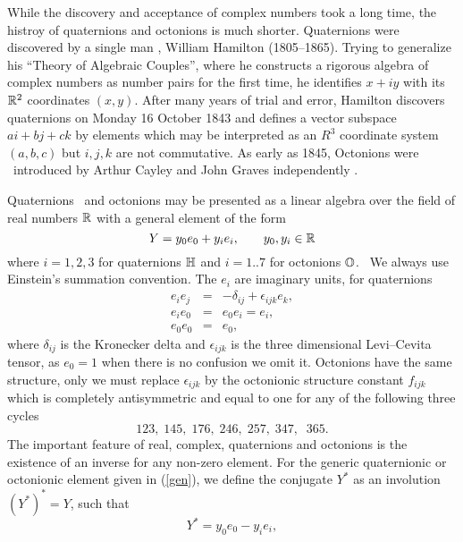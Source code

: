 \documentclass[a4paper,12pt]{book}
\begin{document}
While the discovery and acceptance of complex numbers took a long time, the
histroy of quaternions and octonions is much shorter. Quaternions were
discovered by a single man \cite{ham}, William Hamilton (1805--1865). Trying
to generalize his ``Theory of Algebraic Couples'', where he constructs a
rigorous algebra of complex numbers as number pairs for the first time, he
identifies $x+iy$ with its $\Bbb{R}^{2}$ coordinates $\left( x,y\right) $.
After many years of trial and error, Hamilton discovers quaternions on
Monday 16 October 1843 and defines a vector subspace $ai+bj+ck$ by elements
which may be interpreted as an $R^{3}$ coordinate system $\left(
a,b,c\right) $ but $i,j,k$ are not commutative. As early as 1845, Octonions
were \ introduced by Arthur Cayley and John Graves independently \cite{gra}%
\cite{cay}.

Quaternions \ and octonions may be presented as a linear algebra over the
field of real numbers $\Bbb{R}$ with a general element of the form 
\begin{equation}
Y=y_{0}e_{0}+y_{i}e_{i},\;\;\;\;\;\;\;y_{0},y_{i}\in \Bbb{R}  \label{gen}
\end{equation}
where $i=1,2,3$ for quaternions $\Bbb{H}$ and $i=1..7$ for octonions $\Bbb{O}
$. \ We always use Einstein's summation convention. The $e_{i}$ are
imaginary units, for quaternions 
\begin{eqnarray}
e_{i}e_{j} &=&-\delta _{ij}+\epsilon _{ijk}e_{k}, \\
e_{i}e_{0} &=&e_{0}e_{i}=e_{i}, \\
e_{0}e_{0} &=&e_{0},
\end{eqnarray}
where $\delta _{ij}$ is the Kronecker delta and $\epsilon _{ijk}$ is the
three dimensional Levi--Cevita tensor, as $e_{0}=1$ when there is no
confusion we omit it. Octonions have the same structure, only we must
replace $\epsilon _{ijk}$ by the octonionic structure constant $f_{ijk}$
which is completely antisymmetric and equal to one for any of the following
three cycles 
\begin{equation}
123,\;145,\;176,\;246,\;257,\;347,\;\;365.
\end{equation}
The important feature of real, complex, quaternions and octonions is the
existence of an inverse for any non-zero element. For the generic
quaternionic or octonionic element given in (\ref{gen}), we define the
conjugate $Y^{*}$ as an involution $\left( Y^{*}\right) ^{*}=Y$, such that 
\begin{equation}
Y^{*}=y_{0}e_{0}-y_{i}e_{i},
\end{equation}
\end{document}
